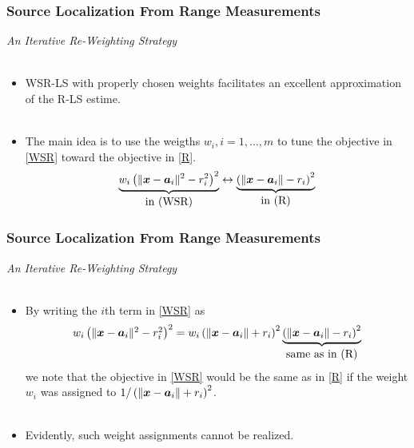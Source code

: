 \documentclass [t] {beamer} %
\begin{document}
\begin{frame} %
\frametitle{Source Localization From Range Measurements}
{\large \textit{An Iterative Re-Weighting Strategy}} \\~\\
\normalsize
\begin{itemize}
\item 
WSR-LS with properly chosen weights facilitates an excellent approximation of the R-LS estime. \\~\\

\item 
The main idea is to use the weigths ${w_i, i = 1, \ldots, m}$ to tune the objective in \eqref{WSR} toward the objective in \eqref{R}. %
\begin{equation} 
\nonumber
\underbrace{w_i\left(\|\mbox{\boldmath$x$}-\mbox{\boldmath$a$}_i\|^2-r_i^2\right)^2}_{\mbox{in (WSR)}}\leftrightarrow\underbrace{\left(\|\mbox{\boldmath$x$}-\mbox{\boldmath$a$}_i\|-r_i\right)^2}_{\mbox{in (R)}}
\end{equation}
\end{itemize}
\end{frame}



\begin{frame} %
\frametitle{Source Localization From Range Measurements}
{\large \textit{An Iterative Re-Weighting Strategy}} \\~\\
\normalsize
\begin{itemize}
\item 
By writing the $i$th term in \eqref{WSR} as
\begin{equation}
\nonumber
\begin{array}{l}
w_i\left(\|\mbox{\boldmath$x$}-\mbox{\boldmath$a$}_i\|^2-r_i^2\right)^2 = w_i\left(\|\mbox{\boldmath$x$}-\mbox{\boldmath$a$}_i\|+r_i\right)^2 \underbrace{\left(\|\mbox{\boldmath$x$}-\mbox{\boldmath$a$}_i\|-r_i\right)^2}_{\mbox{same as in (R)}}
\end{array}
\end{equation}
we note that the objective in \eqref{WSR} would be the same as in \eqref{R} if the weight $w_i$ was assigned to $1/\left(\|\mbox{\boldmath$x$}-\mbox{\boldmath$a$}_i\|+r_i\right)^2$. \\~\\
\item 
Evidently, such weight assignments cannot be realized.
\end{itemize}
\end{frame}
\end{document}
